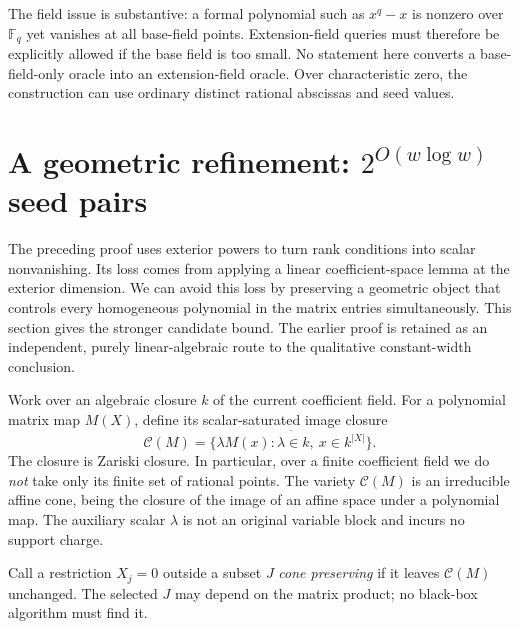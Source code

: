 \documentclass[11pt]{article}
\theoremstyle{definition}\newtheorem{definition}[theorem]{Definition}
\theoremstyle{remark}\newtheorem{remark}[theorem]{Remark}
\newcommand{\F}{\mathbb F}
\begin{document}
The field issue is substantive: a formal polynomial such as $x^q-x$ is
nonzero over $\F_q$ yet vanishes at all base-field points. Extension-field
queries must therefore be explicitly allowed if the base field is too
small. No statement here converts a base-field-only oracle into an
extension-field oracle. Over characteristic zero, the construction can
use ordinary distinct rational abscissas and seed values.

\section{A geometric refinement: \texorpdfstring{$2^{O(w\log w)}$}{2 to O(w log w)} seed pairs}
\label{sec:geometry}

The preceding proof uses exterior powers to turn rank conditions into
scalar nonvanishing. Its loss comes from applying a linear coefficient-space
lemma at the exterior dimension. We can avoid this loss by preserving a
geometric object that controls every homogeneous polynomial in the matrix
entries simultaneously. This section gives the stronger candidate bound.
The earlier proof is retained as an independent, purely linear-algebraic
route to the qualitative constant-width conclusion.

Work over an algebraic closure $k$ of the current coefficient field. For a
polynomial matrix map $M(X)$, define its scalar-saturated image closure
\[
 \mathcal C(M)=\overline{\{\lambda M(x):\lambda\in k,\ x\in k^{|X|}\}}.
\]
The closure is Zariski closure. In particular, over a finite coefficient
field we do \emph{not} take only its finite set of rational points. The
variety $\mathcal C(M)$ is an irreducible affine cone, being the closure of
the image of an affine space under a polynomial map. The auxiliary scalar
$\lambda$ is not an original variable block and incurs no support charge.

Call a restriction $X_j=0$ outside a subset $J$ \emph{cone preserving} if
it leaves $\mathcal C(M)$ unchanged. The selected $J$ may depend on the
matrix product; no black-box algorithm must find it.
\end{document}
